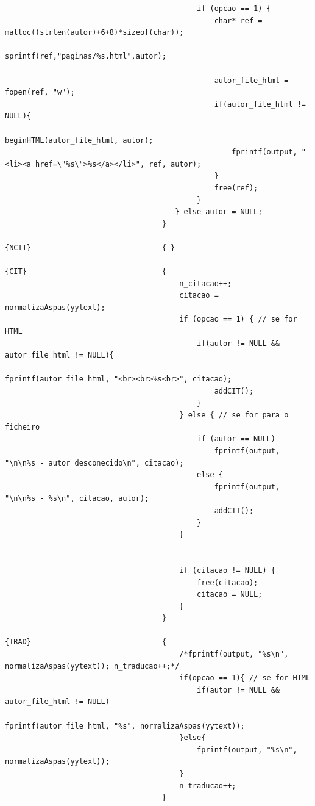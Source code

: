 \documentclass[11pt,a4paper]{report}%
\begin{document}
\begin{verbatim}
                                            if (opcao == 1) {
                                                char* ref = malloc((strlen(autor)+6+8)*sizeof(char));
                                                sprintf(ref,"paginas/%s.html",autor);

                                                autor_file_html = fopen(ref, "w");
                                                if(autor_file_html != NULL){
                                                    beginHTML(autor_file_html, autor);
                                                    fprintf(output, "<li><a href=\"%s\">%s</a></li>", ref, autor);
                                                }
                                                free(ref);
                                            }  
                                       } else autor = NULL;
                                    }

{NCIT}                              { }
 
{CIT}                               { 
                                        n_citacao++; 
                                        citacao = normalizaAspas(yytext);
                                        if (opcao == 1) { // se for HTML
                                            if(autor != NULL && autor_file_html != NULL){
                                                fprintf(autor_file_html, "<br><br>%s<br>", citacao);
                                                addCIT();
                                            }
                                        } else { // se for para o ficheiro
                                            if (autor == NULL) 
                                                fprintf(output, "\n\n%s - autor desconecido\n", citacao); 
                                            else { 
                                                fprintf(output, "\n\n%s - %s\n", citacao, autor);
                                                addCIT();
                                            }
                                        }
                                       
                                       
                                        if (citacao != NULL) {
                                            free(citacao);
                                            citacao = NULL;
                                        }
                                    }
 
{TRAD}                              { 
                                        /*fprintf(output, "%s\n", normalizaAspas(yytext)); n_traducao++;*/ 
                                        if(opcao == 1){ // se for HTML
                                            if(autor != NULL && autor_file_html != NULL)
                                                fprintf(autor_file_html, "%s", normalizaAspas(yytext));
                                        }else{
                                            fprintf(output, "%s\n", normalizaAspas(yytext));
                                        }
                                        n_traducao++;
                                    }


\end{verbatim}
\end{document}
